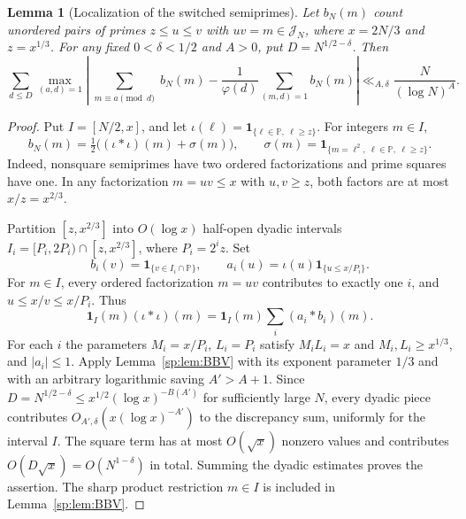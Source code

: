 \documentclass[final,11pt]{elsarticle}
\newtheorem{lemma}[theorem]{Lemma}
\theoremstyle{definition}
\theoremstyle{remark}
\newcommand{\PP}{\mathbb{P}}
\newcommand{\one}{\mathbf1}
\newcommand{\cband}{\mathcal{J}_N}
\numberwithin{equation}{section}
\begin{document}
\begin{lemma}[Localization of the switched semiprimes]
\label{lem:switched-localization}
Let $b_N(m)$ count unordered pairs of primes $z\le u\le v$ with
$uv=m\in\cband$, where $x=2N/3$ and $z=x^{1/3}$.
For any fixed $0<\delta<1/2$ and $A>0$, put $D=N^{1/2-\delta}$.
Then
\begin{equation}\label{eq:switched-localized-BV}
\sum_{d\le D}\max_{(a,d)=1}
\left|\sum_{\substack{m\equiv a\pmod d}}b_N(m)
-\frac1{\varphi(d)}\sum_{(m,d)=1}b_N(m)\right|
\ll_{A,\delta}\frac{N}{(\log N)^A}.
\end{equation}
\end{lemma}
\begin{proof}
Put $I=[N/2,x]$, and let
$\iota(\ell)=\one_{\{\ell\in\PP,\ \ell\ge z\}}$.
For integers $m\in I$,
\[
 b_N(m)=\tfrac12\bigl((\iota*\iota)(m)+\sigma(m)\bigr),
 \qquad \sigma(m)=\one_{\{m=\ell^2,\ \ell\in\PP,\ \ell\ge z\}}.
\]
Indeed, nonsquare semiprimes have two ordered factorizations and
prime squares have one. In any factorization $m=uv\le x$ with
$u,v\ge z$, both factors are at most $x/z=x^{2/3}$.

Partition $[z,x^{2/3}]$ into $O(\log x)$ half-open dyadic intervals
$I_i=[P_i,2P_i)\cap[z,x^{2/3}]$, where $P_i=2^iz$. Set
\[
 b_i(v)=\one_{\{v\in I_i\cap\PP\}},\qquad
 a_i(u)=\iota(u)\one_{\{u\le x/P_i\}}.
\]
For $m\in I$, every ordered factorization $m=uv$ contributes to
exactly one $i$, and $u\le x/v\le x/P_i$. Thus
\[
 \one_I(m)(\iota*\iota)(m)
 =\one_I(m)\sum_i(a_i*b_i)(m).
\]
For each $i$ the parameters $M_i=x/P_i$, $L_i=P_i$ satisfy
$M_iL_i=x$ and $M_i,L_i\ge x^{1/3}$, and $|a_i|\le1$.
Apply Lemma~\ref{sp:lem:BBV} with its exponent parameter $1/3$
and with an arbitrary logarithmic saving $A'>A+1$.
Since $D=N^{1/2-\delta}\le x^{1/2}(\log x)^{-B(A')}$
for sufficiently large $N$, every dyadic piece contributes
$O_{A',\delta}(x(\log x)^{-A'})$ to the discrepancy sum,
uniformly for the interval $I$.
The square term has at most $O(\sqrt x)$ nonzero values and
contributes $O(D\sqrt x)=O(N^{1-\delta})$ in total.
Summing the dyadic estimates proves the assertion. The sharp
product restriction $m\in I$ is included in Lemma~\ref{sp:lem:BBV}.
\end{proof}
\end{document}
